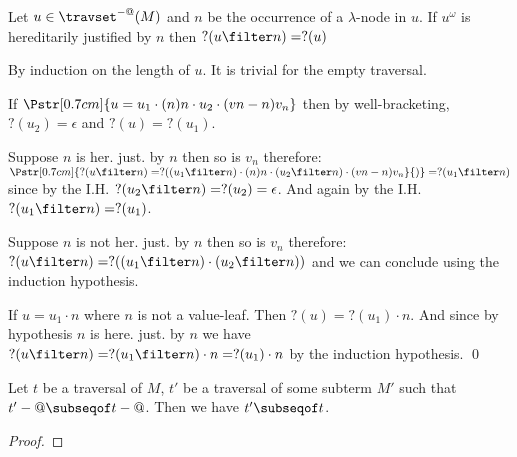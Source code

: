 \begin{lemma}
  Let $u \in \travset^{-@}(M)$ and $n$ be the occurrence of a $\lambda$-node in $u$. If $u^\omega$ is hereditarily justified by $n$ then $?(u\filter n) = ?(u)$
\end{lemma}
\proof
  By induction on the length of $u$. It is trivial for the empty traversal.
  \begin{compactitem}
  \item If $\Pstr[0.7cm]{u = u_1 \cdot (n){n} \cdot u_2 \cdot (vn-n){v_n}}$ then by well-bracketing, $?(u_2) = \epsilon$
  and $?(u) = ?(u_1)$.

  Suppose $n$ is her. just. by $n$ then so is $v_n$ therefore:
  $\Pstr[0.7cm]{{?(u\filter n)} = ?{((u_1\filter n)} \cdot (n){n} \cdot {(u_2\filter n)} \cdot (vn-n){v_n}}{)}
   = ?(u_1\filter n)$ since by the I.H. $?(u_2\filter n) = ?(u_2) = \epsilon$.
   And again by the I.H. $?(u_1\filter n) = ?(u_1)$.

  Suppose $n$ is not her. just. by $n$ then so is $v_n$ therefore:
  $?(u\filter n) = ?((u_1\filter n) \cdot (u_2\filter n))$ and we can conclude using the induction hypothesis.

  \item If $u = u_1 \cdot n$ where $n$ is not a value-leaf. Then $?(u) = ?(u_1) \cdot n$.
  And since by hypothesis $n$ is here. just. by $n$ we have
  $?(u \filter n) = ?(u_1\filter n ) \cdot n = ?(u_1) \cdot n$ by the induction hypothesis. \qed
  \end{compactitem}

\begin{lemma}
Let $t$ be a traversal of $M$, $t'$ be a traversal of some subterm $M'$ such that
$t'-@ \subseqof t-@$. Then we have $t'\subseqof t$.
\end{lemma}
\begin{proof}

\end{proof}


